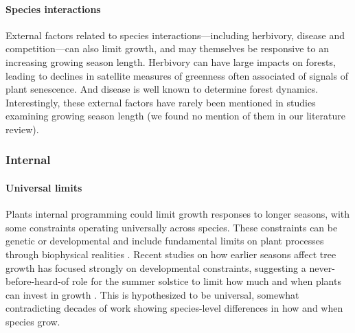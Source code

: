 \documentclass[11pt]{article}
\begin{document}
\paragraph{Species interactions} %

External factors related to species interactions---including herbivory, disease and competition---can also limit growth, and may themselves be responsive to an increasing growing season length. Herbivory can have large impacts on forests, leading to declines in satellite measures of greenness often associated of signals of plant senescence. And disease is well known to determine forest dynamics. Interestingly, these external factors have rarely been mentioned in studies examining growing season length (we found no mention of them in our literature review). 

\subsubsection*{Internal}

\paragraph{Universal limits} 
Plants internal programming could limit growth responses to longer seasons, with some constraints operating universally across species. These constraints can be genetic or developmental and include fundamental limits on plant processes through biophysical realities \citep[e.g., allometry, chemical reaction limits, and genetic architecture that may limit what trait combinations are possible][]{ackerly2000evolution}. Recent studies on how earlier seasons affect tree growth has focused strongly on developmental constraints, suggesting a never-before-heard-of role for the summer solstice to limit how much and when plants can invest in growth \citep{zohner2023effect}. This is hypothesized to be universal, somewhat contradicting decades of work showing species-level differences in how and when species grow. %
\end{document}
